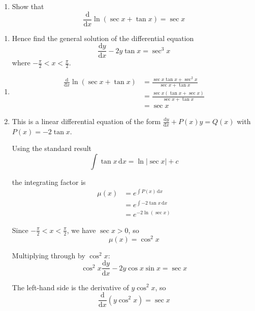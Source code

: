 \documentclass[leqno]{article}
\begin{document}
\begin{enumerate}[
  label=\textbf{\arabic*.},
  leftmargin=*,
  topsep=0pt,
  partopsep=0pt,
  parsep=0pt
]
\newpage

\questionitem

\begin{enumerate}[label=\textbf{(\alph*)}]
  \item Show that
  \[
  \frac{\mathrm{d}}{\mathrm{d}x}\ln(\sec x+\tan x)=\sec x
  \]
\end{enumerate}

\begin{enumerate}[label=\textbf{(\alph*)}, resume]
  \item Hence find the general solution of the differential equation
  \[
  \frac{\mathrm{d}y}{\mathrm{d}x}-2y\tan x=\sec^3 x
  \]
  where $-\frac{\pi}{2}<x<\frac{\pi}{2}$. 
\end{enumerate}

\vspace*{10pt}

\begin{djsSolution}
\begin{enumerate}[label=\textbf{(\alph*)}]
  \item
  \begin{align*}
  \frac{\mathrm{d}}{\mathrm{d}x}\ln(\sec x+\tan x)
  &=\frac{\sec x\tan x+\sec^2 x}{\sec x+\tan x}\\
  &=\frac{\sec x(\tan x+\sec x)}{\sec x+\tan x}\\
  &=\sec x
  \end{align*}

  \item This is a linear differential equation of the form \(\frac{\mathrm{d}y}{\mathrm{d}x}+P(x)y=Q(x)\) with \(P(x)=-2\tan x\).

  Using the standard result
  \[
  \int \tan x\,\mathrm{d}x=\ln|\sec x|+c
  \]

  the integrating factor is
  \begin{align*}
  \mu(x)
  &=e^{\int P(x)\,\mathrm{d}x}\\
  &=e^{\int -2\tan x\,\mathrm{d}x}\\
  &=e^{-2\ln(\sec x)}
  \end{align*}

  Since $-\frac{\pi}{2}<x<\frac{\pi}{2}$, we have $\sec x>0$, so
  \[
  \mu(x)=\cos^2 x
  \]

  Multiplying through by $\cos^2 x$:
  \[
  \cos^2 x\frac{\mathrm{d}y}{\mathrm{d}x}-2y\cos x\sin x=\sec x
  \]

  The left-hand side is the derivative of $y\cos^2 x$, so
  \[
  \frac{\mathrm{d}}{\mathrm{d}x}(y\cos^2 x)=\sec x
  \]


\end{enumerate}
\end{djsSolution}
\end{enumerate}
\end{document}
